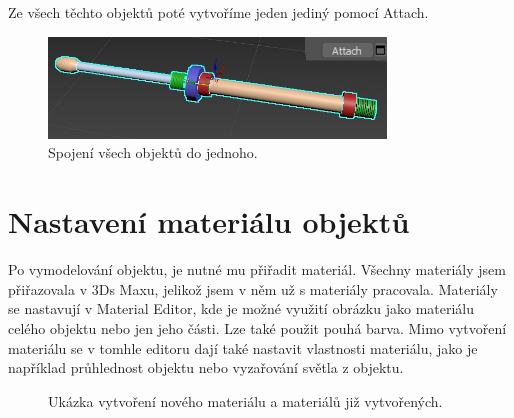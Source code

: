 \documentclass[12pt, a4paper,
twoside,        %
openright
]{report}
\begin{document}
Ze všech těchto objektů poté vytvoříme jeden jediný pomocí Attach. 

\begin{figure}[h!]
	\centering 
	\includegraphics[width=0.8\textwidth]{image/modelovani10.jpg} 
	\caption{Spojení všech objektů do jednoho.} 
	\label{fig:modelovani_cast6} 
\end{figure}


\clearpage
\section {Nastavení materiálu objektů}
\label{material_objektu}
Po vymodelování objektu, je nutné mu přiřadit materiál. Všechny materiály jsem přiřazovala v 3Ds Maxu, jelikož jsem v něm už s materiály pracovala.  Materiály se nastavují v Material Editor, kde je možné využití obrázku jako materiálu celého objektu nebo jen jeho části. Lze také použit pouhá barva. Mimo vytvoření materiálu se v tomhle editoru dají také nastavit vlastnosti materiálu, jako je například průhlednost objektu nebo vyzařování světla z objektu.


\begin{figure}[h!]
	\centering
	\qquad
	\caption{Ukázka  vytvoření nového materiálu a materiálů již vytvořených.}
	\label{fig:editor_materialu}
\end{figure}
\end{document}
